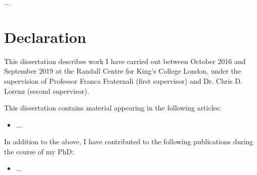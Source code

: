 \cleardoublepage


\makeatletter
\renewcommand{\@pnumwidth}{2em}
\renewcommand{\@tocrmarg}{3em}
\setlength{\cftbeforechapterskip}{.9em}
\makeatother


\thispagestyle{empty}

\begin{vplace}[0.15]

\begin{center}
\it{...}
\end{center} 

\end{vplace}



\cleardoublepage
\newpage
\thispagestyle{plain} %
\mbox{}


\thispagestyle{empty}
\chapter*{Declaration}


\noindent This dissertation describes work I have carried out between October 2016 and September 2019 at the Randall Centre for King's College London, under the supervision of Professor Franca Fraternali (first supervisor) and Dr. Chris D. Lorenz (second supervisor).

\vspace{.2cm}

\noindent This dissertation contains material appearing in the following articles:

\begin{itemize}
\item ...
\end{itemize}

\noindent In addition to the above, I have contributed to the following publications during the course of my PhD:

\begin{itemize}
%
\item ...
%
\end{itemize}
%


